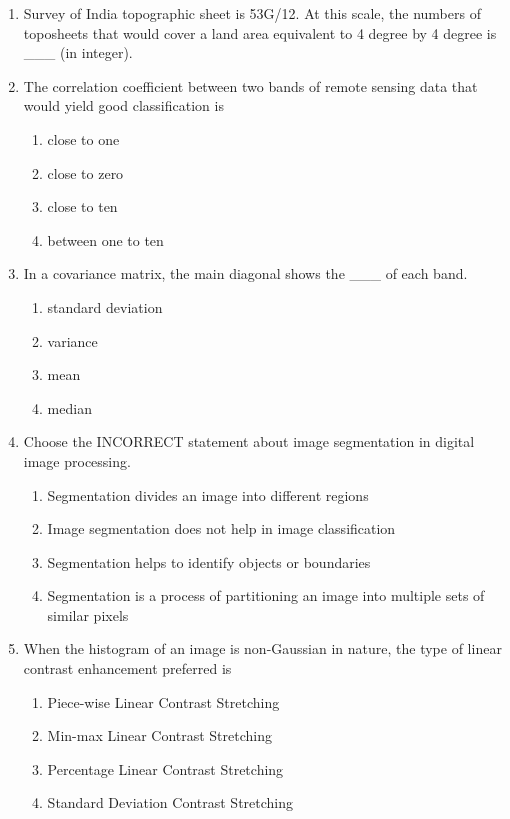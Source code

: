 \documentclass[12pt,a4paper]{article}
\begin{document}
\begin{enumerate}
\item Survey of India topographic sheet is 53G/12. At this scale, the numbers of toposheets that would cover a land area equivalent to 4 degree by 4 degree is \_\_\_ (in integer).

\item The correlation coefficient between two bands of remote sensing data that would yield good classification is
\begin{enumerate}
    \item close to one
    \item close to zero
    \item close to ten
    \item between one to ten
\end{enumerate}

\item In a covariance matrix, the main diagonal shows the \_\_\_ of each band.
\begin{enumerate}
    \item standard deviation
    \item variance
    \item mean
    \item median
\end{enumerate}

\item Choose the INCORRECT statement about image segmentation in digital image processing.
\begin{enumerate}
    \item Segmentation divides an image into different regions
    \item Image segmentation does not help in image classification
    \item Segmentation helps to identify objects or boundaries
    \item Segmentation is a process of partitioning an image into multiple sets of similar pixels
\end{enumerate}

\item When the histogram of an image is non-Gaussian in nature, the type of linear contrast enhancement preferred is
\begin{enumerate}
    \item Piece-wise Linear Contrast Stretching
    \item Min-max Linear Contrast Stretching
    \item Percentage Linear Contrast Stretching
    \item Standard Deviation Contrast Stretching
\end{enumerate}


\end{enumerate}
\end{document}
